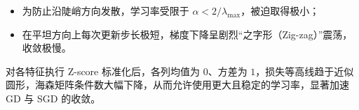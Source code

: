 \begin{exercise}[title={波士顿房价回归评估与特征标准化对 SGD 的影响},level=advanced,points=18,tags={多元线性回归,SGD,特征标准化,RMSE}]
\begin{solution}
\begin{enumerate}
  \begin{itemize}
    \item 为防止沿陡峭方向发散，学习率受限于 $\alpha < 2/\lambda_{\max}$，被迫取得极小；
    \item 在平坦方向上每次更新步长极短，梯度下降呈剧烈“之字形（Zig-zag）”震荡，收敛极慢。
  \end{itemize}
  对各特征执行 Z-score 标准化后，各列均值为 $0$、方差为 $1$，损失等高线趋于近似圆形，海森矩阵条件数大幅下降，从而允许使用更大且稳定的学习率，显著加速 GD 与 SGD 的收敛。
\end{enumerate}
\end{solution}
\end{exercise}
